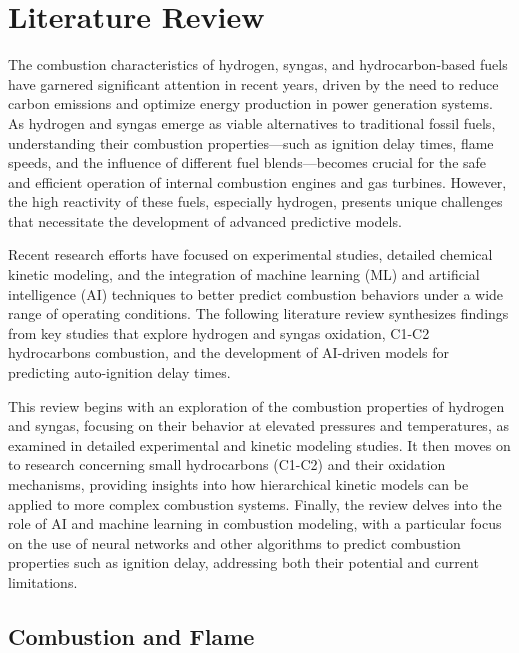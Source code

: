 \documentclass[12pt]{report}
\begin{document}
\newpage


\chapter{Literature Review}
The combustion characteristics of hydrogen, syngas, and hydrocarbon-based fuels have garnered significant attention in recent years, driven by the need to reduce carbon emissions and optimize energy production in power generation systems. As hydrogen and syngas emerge as viable alternatives to traditional fossil fuels, understanding their combustion properties—such as ignition delay times, flame speeds, and the influence of different fuel blends—becomes crucial for the safe and efficient operation of internal combustion engines and gas turbines. However, the high reactivity of these fuels, especially hydrogen, presents unique challenges that necessitate the development of advanced predictive models.

Recent research efforts have focused on experimental studies, detailed chemical kinetic modeling, and the integration of machine learning (ML) and artificial intelligence (AI) techniques to better predict combustion behaviors under a wide range of operating conditions. The following literature review synthesizes findings from key studies that explore hydrogen and syngas oxidation, C1-C2 hydrocarbons combustion, and the development of AI-driven models for predicting auto-ignition delay times.

This review begins with an exploration of the combustion properties of hydrogen and syngas, focusing on their behavior at elevated pressures and temperatures, as examined in detailed experimental and kinetic modeling studies. It then moves on to research concerning small hydrocarbons (C1-C2) and their oxidation mechanisms, providing insights into how hierarchical kinetic models can be applied to more complex combustion systems. Finally, the review delves into the role of AI and machine learning in combustion modeling, with a particular focus on the use of neural networks and other algorithms to predict combustion properties such as ignition delay, addressing both their potential and current limitations.

\section{Combustion and Flame}
\end{document}
